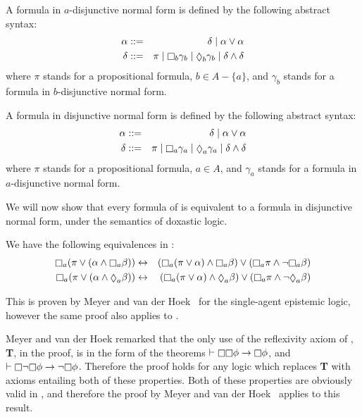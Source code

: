 \begin{definition}
A formula in $a$-disjunctive normal form is defined by the following abstract syntax:
\begin{eqnarray*}
\alpha &::=& \delta \bnfalt \alpha \lor \alpha\\
\delta &::=& \pi \bnfalt \knows_b \gamma_b \bnfalt \suspects_b \gamma_b \bnfalt
\delta \land \delta\\
\end{eqnarray*}
where $\pi$ stands for a propositional formula, $b \in A - \{a\}$, and
$\gamma_b$ stands for a formula in $b$-disjunctive normal form.

A formula in disjunctive normal form is defined by the following abstract syntax:
\begin{eqnarray*}
\alpha &::=& \delta \bnfalt \alpha \lor \alpha\\
\delta &::=& \pi \bnfalt \knows_a \gamma_a \bnfalt \suspects_a \gamma_a \bnfalt
\delta \land \delta\\
\end{eqnarray*}
where $\pi$ stands for a propositional formula, $a \in A$, and $\gamma_a$
stands for a formula in $a$-disjunctive normal form.
\end{definition}

We will now show that every formula of \lang{} is equivalent to a formula in
disjunctive normal form, under the semantics of doxastic logic.

\begin{lemma}\label{kd45-dnf-equivalences}
We have the following equivalences in \logicKD{}:
\begin{eqnarray*}
\knows_a (\pi \lor (\alpha \land \knows_a \beta)) &\iff& (\knows_a (\pi \lor \alpha)
\land \knows_a \beta) \lor (\knows_a \pi \land \neg \knows_a \beta)\\
\knows_a (\pi \lor (\alpha \land \suspects_a \beta)) &\iff& (\knows_a (\pi \lor \alpha)
\land \suspects_a \beta) \lor (\knows_a \pi \land \neg \suspects_a \beta)
\end{eqnarray*}
\end{lemma}

This is proven by Meyer and van der Hoek~\cite{meyer2004epistemic} for the
single-agent epistemic logic, however the same proof also applies to \logicKD{}.

Meyer and van der Hoek remarked that the only use of the reflexivity axiom of
\logicS{}, {\bf T}, in the proof, is in the form of the theorems $\proves \knows
\knows \phi \implies \knows \phi$, and $\proves \knows \neg \knows \phi \implies
\neg \knows \phi$. Therefore the proof holds for any logic which replaces {\bf
T} with axioms entailing both of these properties. Both of these properties are
obviously valid in \logicKD{}, and therefore the proof by Meyer and van der
Hoek~\cite{meyer2004epistemic} applies to this result.

